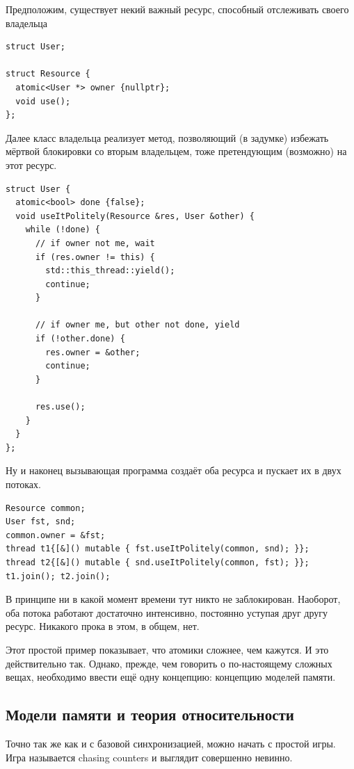 \documentclass[a4paper,12pt,oneside]{book}
\begin{document}
Предположим, существует некий важный ресурс, способный отслеживать своего владельца

\begin{lstlisting}
struct User;

struct Resource {
  atomic<User *> owner {nullptr};
  void use();
};
\end{lstlisting}

Далее класс владельца реализует метод, позволяющий (в задумке) избежать мёртвой блокировки со вторым владельцем, тоже претендующим (возможно) на этот ресурс.

\begin{lstlisting}
struct User {
  atomic<bool> done {false};
  void useItPolitely(Resource &res, User &other) {
    while (!done) {
      // if owner not me, wait
      if (res.owner != this) {
        std::this_thread::yield();
        continue;
      }

      // if owner me, but other not done, yield
      if (!other.done) {
        res.owner = &other;
        continue;
      }

      res.use();
    }
  }
};
\end{lstlisting}

Ну и наконец вызывающая программа создаёт оба ресурса и пускает их в двух потоках.

\begin{lstlisting}
Resource common;
User fst, snd;
common.owner = &fst;
thread t1{[&]() mutable { fst.useItPolitely(common, snd); }};
thread t2{[&]() mutable { snd.useItPolitely(common, fst); }};
t1.join(); t2.join();
\end{lstlisting}

В принципе ни в какой момент времени тут никто не заблокирован. Наоборот, оба потока работают достаточно интенсивно, постоянно уступая друг другу ресурс. Никакого прока в этом, в общем, нет.

Этот простой пример показывает, что атомики сложнее, чем кажутся. И это действительно так. Однако, прежде, чем говорить о по-настоящему сложных вещах, необходимо ввести ещё одну концепцию: концепцию моделей памяти.

\subsection{Модели памяти и теория относительности}\label{sub:relativity}

Точно так же как и с базовой синхронизацией, можно начать с простой игры. Игра называется chasing counters и выглядит совершенно невинно.
\end{document}
